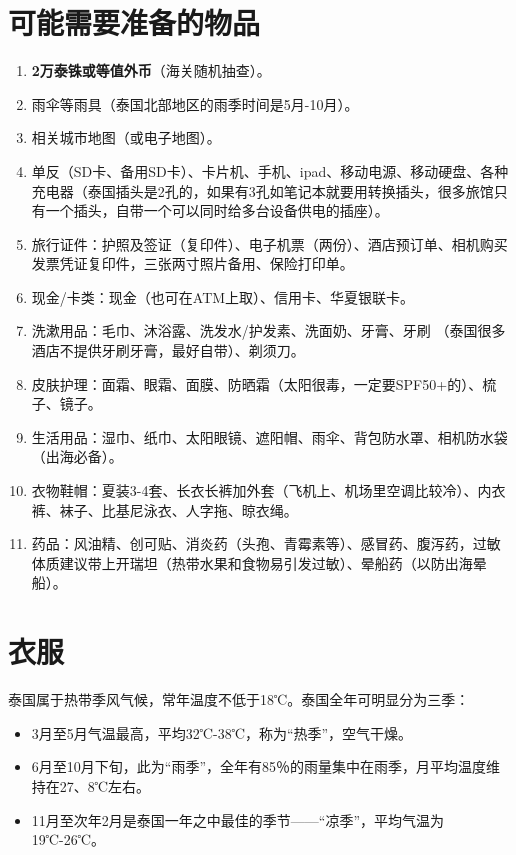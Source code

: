 \documentclass[utf-8,10pt]{ctexart}
\begin{document}
\section{可能需要准备的物品}
\begin{enumerate}
\item \textbf{2万泰铢或等值外币}（海关随机抽查）。
\item 雨伞等雨具（泰国北部地区的雨季时间是5月-10月）。
\item 相关城市地图（或电子地图）。
\item 单反（SD卡、备用SD卡）、卡片机、手机、ipad、移动电源、移动硬盘、各种充电器（泰国插头是2孔的，如果有3孔如笔记本就要用转换插头，很多旅馆只有一个插头，自带一个可以同时给多台设备供电的插座）。
\item 旅行证件：护照及签证（复印件）、电子机票（两份）、酒店预订单、相机购买发票凭证复印件，三张两寸照片备用、保险打印单。
\item 现金/卡类：现金（也可在ATM上取）、信用卡、华夏银联卡。
\item 洗漱用品：毛巾、沐浴露、洗发水/护发素、洗面奶、牙膏、牙刷 （泰国很多酒店不提供牙刷牙膏，最好自带）、剃须刀。
\item 皮肤护理：面霜、眼霜、面膜、防晒霜（太阳很毒，一定要SPF50+的）、梳子、镜子。
\item 生活用品：湿巾、纸巾、太阳眼镜、遮阳帽、雨伞、背包防水罩、相机防水袋（出海必备）。
\item 衣物鞋帽：夏装3-4套、长衣长裤加外套（飞机上、机场里空调比较冷）、内衣裤、袜子、比基尼泳衣、人字拖、晾衣绳。
\item 药品：风油精、创可贴、消炎药（头孢、青霉素等）、感冒药、腹泻药，过敏体质建议带上开瑞坦（热带水果和食物易引发过敏）、晕船药（以防出海晕船）。
\end{enumerate}
\section{衣服}
泰国属于热带季风气候，常年温度不低于18℃。泰国全年可明显分为三季：
\begin{itemize}
\item 3月至5月气温最高，平均32℃-38℃，称为“热季”，空气干燥。
\item 6月至10月下旬，此为“雨季”，全年有85％的雨量集中在雨季，月平均温度维持在27、8℃左右。
\item 11月至次年2月是泰国一年之中最佳的季节——“凉季”，平均气温为19℃-26℃。
\end{itemize}
\end{document}
